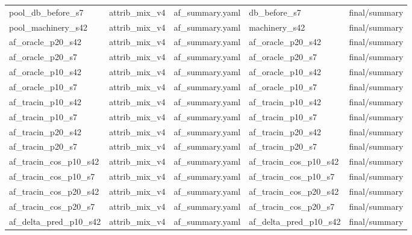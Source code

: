 \documentclass[10pt]{article}
\begin{document}
\begin{table}[tbp]
{\begin{tabular}{ lllll }
pool\_db\_before\_s7 & attrib\_mix\_v4 & af\_summary.yaml & db\_before\_s7 & final/summary \\

pool\_machinery\_s42 & attrib\_mix\_v4 & af\_summary.yaml & machinery\_s42 & final/summary \\

af\_oracle\_p20\_s42 & attrib\_mix\_v4 & af\_summary.yaml & af\_oracle\_p20\_s42 & final/summary \\

af\_oracle\_p20\_s7 & attrib\_mix\_v4 & af\_summary.yaml & af\_oracle\_p20\_s7 & final/summary \\

af\_oracle\_p10\_s42 & attrib\_mix\_v4 & af\_summary.yaml & af\_oracle\_p10\_s42 & final/summary \\

af\_oracle\_p10\_s7 & attrib\_mix\_v4 & af\_summary.yaml & af\_oracle\_p10\_s7 & final/summary \\

af\_tracin\_p10\_s42 & attrib\_mix\_v4 & af\_summary.yaml & af\_tracin\_p10\_s42 & final/summary \\

af\_tracin\_p10\_s7 & attrib\_mix\_v4 & af\_summary.yaml & af\_tracin\_p10\_s7 & final/summary \\

af\_tracin\_p20\_s42 & attrib\_mix\_v4 & af\_summary.yaml & af\_tracin\_p20\_s42 & final/summary \\

af\_tracin\_p20\_s7 & attrib\_mix\_v4 & af\_summary.yaml & af\_tracin\_p20\_s7 & final/summary \\

af\_tracin\_cos\_p10\_s42 & attrib\_mix\_v4 & af\_summary.yaml & af\_tracin\_cos\_p10\_s42 & final/summary \\

af\_tracin\_cos\_p10\_s7 & attrib\_mix\_v4 & af\_summary.yaml & af\_tracin\_cos\_p10\_s7 & final/summary \\

af\_tracin\_cos\_p20\_s42 & attrib\_mix\_v4 & af\_summary.yaml & af\_tracin\_cos\_p20\_s42 & final/summary \\

af\_tracin\_cos\_p20\_s7 & attrib\_mix\_v4 & af\_summary.yaml & af\_tracin\_cos\_p20\_s7 & final/summary \\

af\_delta\_pred\_p10\_s42 & attrib\_mix\_v4 & af\_summary.yaml & af\_delta\_pred\_p10\_s42 & final/summary \\


\end{tabular}}
\end{table}
\end{document}

